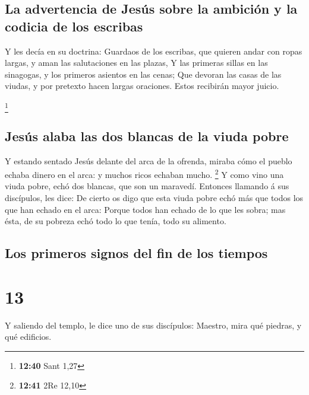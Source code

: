 \hypertarget{la-advertencia-de-jesuxfas-sobre-la-ambiciuxf3n-y-la-codicia-de-los-escribas}{%
\subsection{La advertencia de Jesús sobre la ambición y la codicia de
los
escribas}\label{la-advertencia-de-jesuxfas-sobre-la-ambiciuxf3n-y-la-codicia-de-los-escribas}}

 Y les decía en su doctrina: Guardaos de los escribas, que
quieren andar con ropas largas, y aman las salutaciones en las plazas,
 Y las primeras sillas en las sinagogas, y los primeros
asientos en las cenas;  Que devoran las casas de las
viudas, y por pretexto hacen largas oraciones. Estos recibirán mayor
juicio.

\footnote{\textbf{12:40} Sant 1,27}

\hypertarget{jesuxfas-alaba-las-dos-blancas-de-la-viuda-pobre}{%
\subsection{Jesús alaba las dos blancas de la viuda
pobre}\label{jesuxfas-alaba-las-dos-blancas-de-la-viuda-pobre}}

 Y estando sentado Jesús delante del arca de la ofrenda,
miraba cómo el pueblo echaba dinero en el arca: y muchos ricos echaban
mucho. \footnote{\textbf{12:41} 2Re 12,10}  Y como vino una
viuda pobre, echó dos blancas, que son un maravedí. 
Entonces llamando á sus discípulos, les dice: De cierto os digo que esta
viuda pobre echó más que todos los que han echado en el arca:
 Porque todos han echado de lo que les sobra; mas ésta, de
su pobreza echó todo lo que tenía, todo su alimento.

\hypertarget{los-primeros-signos-del-fin-de-los-tiempos}{%
\subsection{Los primeros signos del fin de los
tiempos}\label{los-primeros-signos-del-fin-de-los-tiempos}}

\hypertarget{section-12}{%
\section{13}\label{section-12}}

 Y saliendo del templo, le dice uno de sus discípulos:
Maestro, mira qué piedras, y qué edificios.


